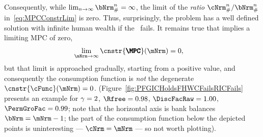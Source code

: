 \documentclass[\econtexRoot/BufferStockTheory]{subfiles}
\begin{document}
Consequently, while $\lim_{n \rightarrow \infty} \bNrm_{\#}^{n} = \infty$, the limit of the \textit{ratio} $\cNrm_{\#}^{n}/\bNrm_{\#}^{n}$ in~\eqref{eq:MPCConstrLim} is zero.
Thus, surprisingly, the problem has a well defined solution with
infinite human wealth if the \RIC~fails.
It remains true that \cncl{\RIC}
implies a limiting MPC of zero,
\begin{equation}\begin{gathered}\begin{aligned}
  \lim_{\mNrm \rightarrow \infty} \cnstr{\pmb{\MPC}}(\mNrm)   & = 0,
\end{aligned}\end{gathered}\end{equation}
but that limit is approached gradually, starting from a positive value, and consequently the consumption function is \textit{not} the degenerate $\cnstr{\cFunc}(\mNrm)=0$.
(Figure~\ref{fig:PFGICHoldsFHWCFailsRICFails} presents an example for $\gamma=2$, $\Rfree=0.98$, $\DiscFacRaw = 1.00$, $\PermGroFac = 0.99$; note that the horizontal axis is bank balances $\bNrm = \mNrm-1$; the part of the consumption function below the depicted points is uninteresting --- $\cNrm = \mNrm$ --- so not worth plotting).



\end{document}
